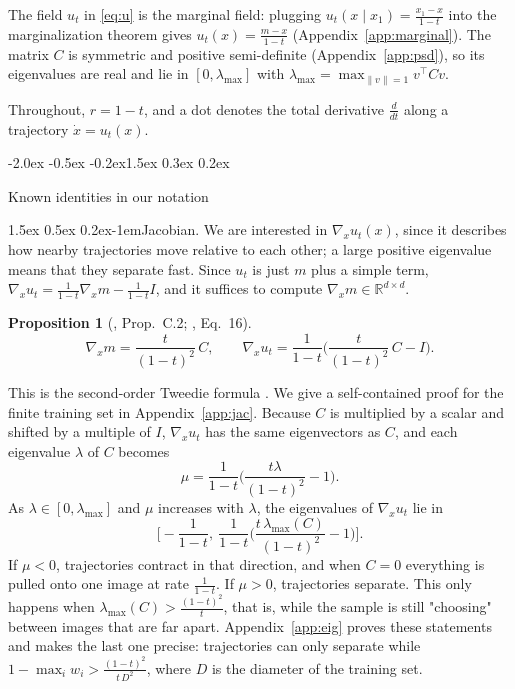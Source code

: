 \documentclass{article}
\makeatletter
\renewcommand{\normalsize}{\fontsize{10pt}{11pt}\selectfont}
\renewcommand{\section}{\@startsection{section}{1}{\z@}%
  {-2.0ex \@plus -0.5ex \@minus -0.2ex}{1.5ex \@plus 0.3ex \@minus 0.2ex}{\large\bfseries\raggedright}}
\renewcommand{\paragraph}{\@startsection{paragraph}{4}{\z@}%
  {1.5ex \@plus 0.5ex \@minus 0.2ex}{-1em}{\normalsize\bfseries}}
\newtheorem{proposition}{Proposition}
\theoremstyle{remark}
\newcommand{\R}{\mathbb{R}}
\newcommand{\lmax}{\lambda_{\max}}
\makeatother
\begin{document}
The field $u_t$ in \eqref{eq:u} is the marginal field: plugging $u_t(x\mid x_1) = \frac{x_1 - x}{1 - t}$ into the marginalization theorem gives $u_t(x) = \frac{m - x}{1 - t}$ (Appendix~\ref{app:marginal}). The matrix $C$ is symmetric and positive semi-definite (Appendix~\ref{app:psd}), so its eigenvalues are real and lie in $[0,\lmax]$ with $\lmax = \max_{\|v\| = 1}v^\top Cv$.

Throughout, $r = 1 - t$, and a dot denotes the total derivative $\frac{d}{dt}$ along a trajectory $\dot x = u_t(x)$.

\section{Known identities in our notation}\label{sec:known}

\paragraph{Jacobian.} We are interested in $\nabla_xu_t(x)$, since it describes how nearby trajectories move relative to each other; a large positive eigenvalue means that they separate fast. Since $u_t$ is just $m$ plus a simple term, $\nabla_xu_t = \frac{1}{1 - t}\nabla_xm - \frac{1}{1 - t}I$, and it suffices to compute $\nabla_xm \in \R^{d \times d}$.

\begin{proposition}[\citealp{wan2024elucidating}, Prop.~C.2; \citealp{lv2026uncertainty}, Eq.~16]\label{prop:jac}
\begin{equation}\label{eq:jac}
  \nabla_xm = \frac{t}{(1 - t)^2}\,C,\qquad
  \nabla_xu_t = \frac{1}{1 - t}\Big(\frac{t}{(1 - t)^2}\,C - I\Big).
\end{equation}
\end{proposition}
This is the second-order Tweedie formula \citep{efron2011tweedie,manor2024posterior}. We give a self-contained proof for the finite training set in Appendix~\ref{app:jac}. Because $C$ is multiplied by a scalar and shifted by a multiple of $I$, $\nabla_xu_t$ has the same eigenvectors as $C$, and each eigenvalue $\lambda$ of $C$ becomes
\[
  \mu = \frac{1}{1 - t}\Big(\frac{t\lambda}{(1 - t)^2} - 1\Big).
\]
As $\lambda \in [0,\lmax]$ and $\mu$ increases with $\lambda$, the eigenvalues of $\nabla_xu_t$ lie in
\begin{equation}\label{eq:eigrange}
  \Big[-\frac{1}{1 - t},\ \frac{1}{1 - t}\Big(\frac{t\,\lmax(C)}{(1 - t)^2} - 1\Big)\Big].
\end{equation}
If $\mu < 0$, trajectories contract in that direction, and when $C = 0$ everything is pulled onto one image at rate $\frac{1}{1 - t}$. If $\mu > 0$, trajectories separate. This only happens when $\lmax(C) > \frac{(1 - t)^2}{t}$, that is, while the sample is still "choosing" between images that are far apart. Appendix~\ref{app:eig} proves these statements and makes the last one precise: trajectories can only separate while $1 - \max_iw_i > \frac{(1 - t)^2}{t\,D^2}$, where $D$ is the diameter of the training set.
\end{document}
